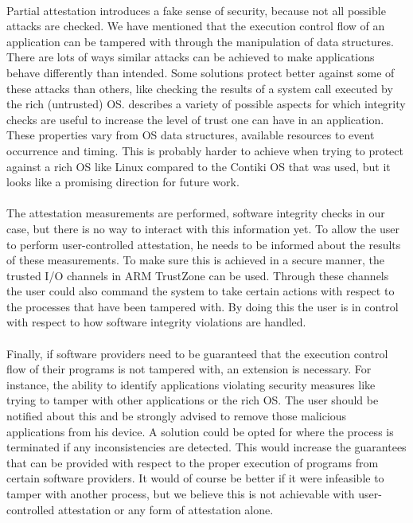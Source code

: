 \paragraph*{}
Partial attestation introduces a fake sense of security, because not all possible attacks are checked. We have mentioned that the execution control flow of an application can be tampered with through the manipulation of data structures. There are lots of ways similar attacks can be achieved to make applications behave differently than intended. Some solutions protect better against some of these attacks than others, like checking the results of a system call executed by the rich (untrusted) OS. \cite{MuhlbergJanTobias2016LaFT} describes a variety of possible aspects for which integrity checks are useful to increase the level of trust one can have in an application. These properties vary from OS data structures, available resources to event occurrence and timing. This is probably harder to achieve when trying to protect against a rich OS like Linux compared to the Contiki OS that was used, but it looks like a promising direction for future work.

\paragraph*{}
The attestation measurements are performed, software integrity checks in our case, but there is no way to interact with this information yet. To allow the user to perform user-controlled attestation, he needs to be informed about the results of these measurements. To make sure this is achieved in a secure manner, the trusted I/O channels in ARM TrustZone can be used. Through these channels the user could also command the system to take certain actions with respect to the processes that have been tampered with. By doing this the user is in control with respect to how software integrity violations are handled.

\paragraph*{}
Finally, if software providers need to be guaranteed that the execution control flow of their programs is not tampered with, an extension is necessary. For instance, the ability to identify applications violating security measures like trying to tamper with other applications or the rich OS. The user should be notified about this and be strongly advised to remove those malicious applications from his device. A solution could be opted for where the process is terminated if any inconsistencies are detected. This would increase the guarantees that can be provided with respect to the proper execution of programs from certain software providers. It would of course be better if it were infeasible to tamper with another process, but we believe this is not achievable with user-controlled attestation or any form of attestation alone.